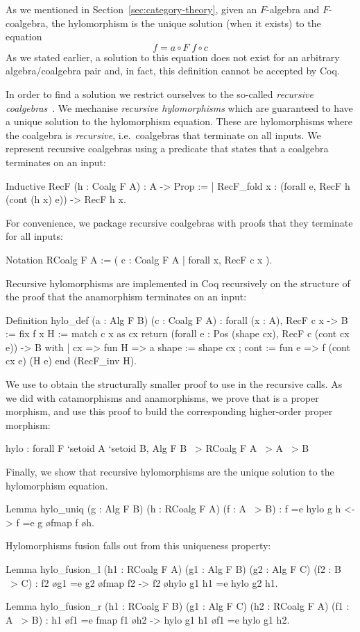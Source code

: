 \documentclass[a4paper,anonymous, UKenglish,cleveref, autoref, thm-restate]{lipics-v2021}
\begin{document}
As we mentioned in Section~\ref{sec:category-theory}, given an $F$-algebra and
$F$-coalgebra, the hylomorphism is the unique solution (when it exists) to the
equation
\[
  f = a \circ F\; f \circ c
\]
As we stated earlier, a solution to this equation does not exist for an
arbitrary  algebra/coalgebra pair and, in fact, this definition cannot be
accepted by Coq.

In order to find a solution we restrict ourselves to the so-called
\emph{recursive coalgebras}~\cite{AdamekMM19,CaprettaUV04}.  We mechanise
\emph{recursive hylomorphisms} which are guaranteed to have a unique solution to
the hylomorphism equation. These are hylomorphisms where the coalgebra is
\emph{recursive}, i.e.\ coalgebras that terminate on all inputs. We represent
recursive coalgebras using a predicate that states that a coalgebra terminates
on an input:
\begin{coqcode}
Inductive RecF (h : Coalg F A) : A -> Prop :=
| RecF_fold x : (forall e, RecF h (cont (h x) e)) -> RecF h x.
\end{coqcode}
For convenience, we package recursive coalgebras with proofs that they terminate
for all inputs:
\begin{coqcode}
Notation RCoalg F A := ({ c : Coalg F A | forall x, RecF c x }).
\end{coqcode}
Recursive hylomorphisms are implemented in Coq recursively on the structure of
the proof that the anamorphism terminates on an input:
\begin{coqcode}
Definition hylo_def (a : Alg F B) (c : Coalg F A) : forall (x : A), RecF c x -> B
  := fix f x H
     := match c x as cx return (forall e : Pos (shape cx), RecF c (cont cx e)) -> B with
        | cx => fun H => a { shape := shape cx ; cont := fun e => f (cont cx e) (H e) }
        end (RecF_inv H).
\end{coqcode}

\noindent
We use  to obtain the structurally smaller proof to use in
the recursive calls.
As we did with catamorphisms and anamorphisms, we
prove that  is a proper morphism, and use this proof to build the
corresponding higher-order proper morphism:
\begin{coqcode}
hylo : forall F `{setoid A} `{setoid B}, Alg F B ~> RCoalg F A ~> A ~> B
\end{coqcode}
Finally, we show that recursive hylomorphisms are the unique solution to the
hylomorphism equation.
\begin{coqcode}
Lemma hylo_uniq (g : Alg F B) (h : RCoalg F A) (f : A ~> B)
    : f =e hylo g h <-> f =e g \o fmap f \o h.
\end{coqcode}
Hylomorphisms fusion falls out from this uniqueness property:
\begin{coqcode}
Lemma hylo_fusion_l (h1 : RCoalg F A) (g1 : Alg F B) (g2 : Alg F C) (f2 : B ~> C)
  : f2 \o g1 =e g2 \o fmap f2 -> f2 \o hylo g1 h1 =e hylo g2 h1.

Lemma hylo_fusion_r (h1 : RCoalg F B) (g1 : Alg F C) (h2 : RCoalg F A) (f1 : A ~> B)
  :  h1 \o f1 =e fmap f1 \o h2 -> hylo g1 h1 \o f1 =e hylo g1 h2.
\end{coqcode}
\end{document}
